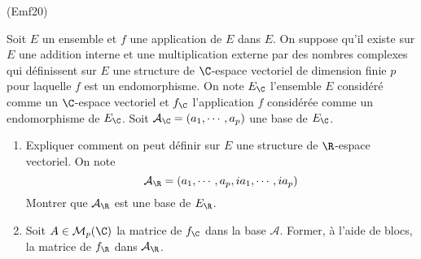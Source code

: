 \begin{tiny}(Emf20)\end{tiny} Soit $E$ un ensemble et $f$ une application de $E$ dans $E$. On suppose qu'il existe sur $E$ une addition interne et une multiplication externe par des nombres complexes qui définissent sur $E$ une structure de $\C$-espace vectoriel de dimension finie $p$ pour laquelle $f$ est un endomorphisme. On note $E_\C$ l'ensemble $E$ considéré comme un $\C$-espace vectoriel et $f_\C$ l'application $f$ considérée comme un endomorphisme de $E_\C$. Soit $\mathcal{A}_\C=(a_1,\cdots,a_p)$ une base de $E_\C$.
\begin{enumerate}
 \item Expliquer comment on peut définir sur $E$ une structure de $\R$-espace vectoriel. On note 
\begin{displaymath}
\mathcal{A}_\R=(a_1,\cdots,a_p,ia_1,\cdots,ia_p) 
\end{displaymath}
Montrer que $\mathcal{A}_\R$ est une base de $E_\R$.
 \item Soit $A\in\mathcal{M}_p(\C)$ la matrice de $f_\C$ dans la base $\mathcal{A}$. Former, à l'aide de blocs, la matrice de $f_\R$ dans $\mathcal{A}_\R$.
\end{enumerate}
